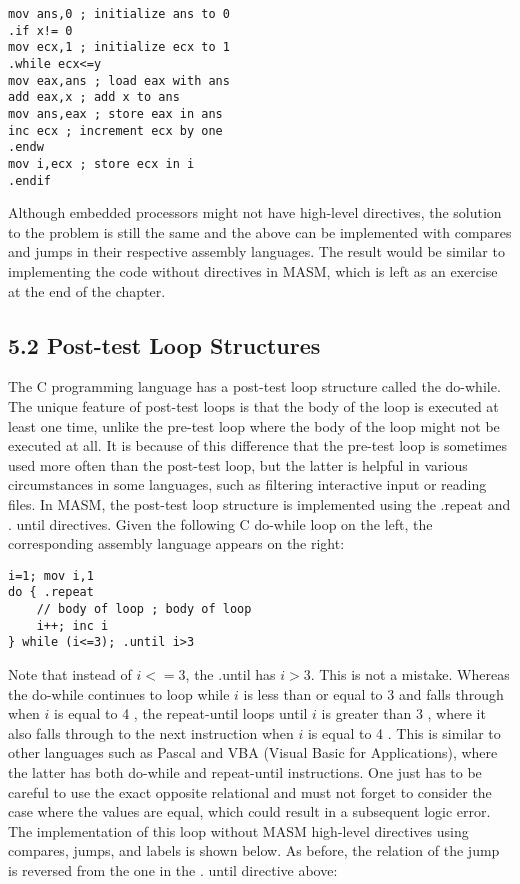 \documentclass[10pt]{article}
\begin{document}
\begin{verbatim}
mov ans,0 ; initialize ans to 0
.if x!= 0
mov ecx,1 ; initialize ecx to 1
.while ecx<=y
mov eax,ans ; load eax with ans
add eax,x ; add x to ans
mov ans,eax ; store eax in ans
inc ecx ; increment ecx by one
.endw
mov i,ecx ; store ecx in i
.endif
\end{verbatim}

Although embedded processors might not have high-level directives, the solution to the problem is still the same and the above can be implemented with compares and jumps in their respective assembly languages. The result would be similar to implementing the code without directives in MASM, which is left as an exercise at the end of the chapter.

\subsection*{5.2 Post-test Loop Structures}
The C programming language has a post-test loop structure called the do-while. The unique feature of post-test loops is that the body of the loop is executed at least one time, unlike the pre-test loop where the body of the loop might not be executed at all. It is because of this difference that the pre-test loop is sometimes used more often than the post-test loop, but the latter is helpful in various circumstances in some languages, such as filtering interactive input or reading files. In MASM, the post-test loop structure is implemented using the .repeat and . until directives. Given the following C do-while loop on the left, the corresponding assembly language appears on the right:

\begin{verbatim}
i=1; mov i,1
do { .repeat
    // body of loop ; body of loop
    i++; inc i
} while (i<=3); .until i>3
\end{verbatim}

Note that instead of $i<=3$, the .until has $i>3$. This is not a mistake. Whereas the do-while continues to loop while $i$ is less than or equal to 3 and falls through when $i$ is equal to 4 , the repeat-until loops until $i$ is greater than 3 , where it also falls through to the next instruction when $i$ is equal to 4 . This is similar to other languages such as Pascal and VBA (Visual Basic for Applications), where the latter has both do-while and repeat-until instructions. One just has to be careful to use the exact opposite relational and must not forget to consider the case where the values are equal, which could result in a subsequent logic error. The implementation of this loop without MASM high-level directives using compares, jumps, and labels is shown below. As before, the relation of the jump is reversed from the one in the . until directive above:
\end{document}
